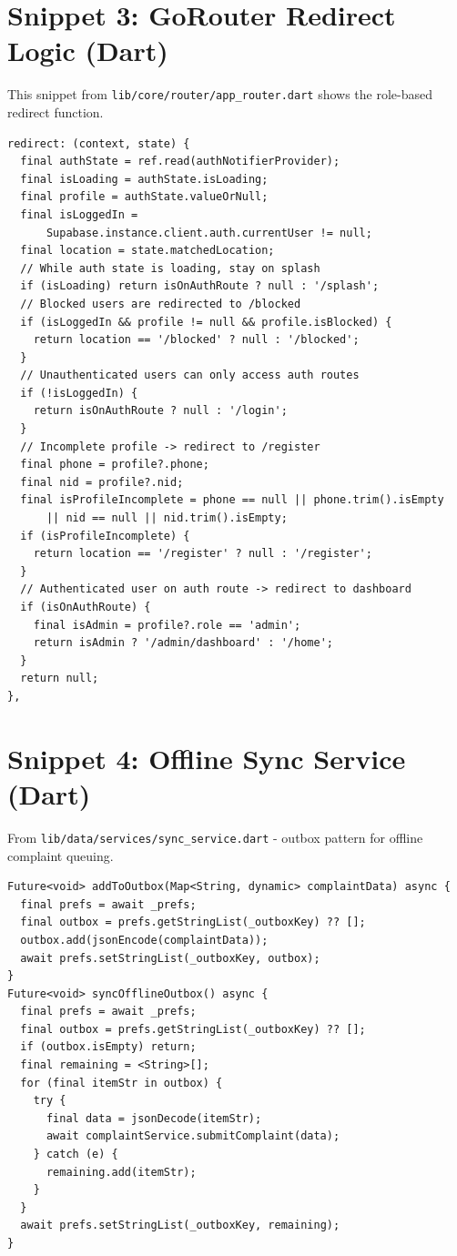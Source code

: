 \documentclass[12pt, a4paper, twoside]{report}
\begin{document}
\section*{Snippet 3: GoRouter Redirect Logic (Dart)}
This snippet from \texttt{lib/core/router/app\_router.dart} shows the role-based redirect function.
\begin{footnotesize}
\begin{verbatim}
redirect: (context, state) {
  final authState = ref.read(authNotifierProvider);
  final isLoading = authState.isLoading;
  final profile = authState.valueOrNull;
  final isLoggedIn = 
      Supabase.instance.client.auth.currentUser != null;
  final location = state.matchedLocation;
  // While auth state is loading, stay on splash
  if (isLoading) return isOnAuthRoute ? null : '/splash';
  // Blocked users are redirected to /blocked
  if (isLoggedIn && profile != null && profile.isBlocked) {
    return location == '/blocked' ? null : '/blocked';
  }
  // Unauthenticated users can only access auth routes
  if (!isLoggedIn) {
    return isOnAuthRoute ? null : '/login';
  }
  // Incomplete profile -> redirect to /register
  final phone = profile?.phone;
  final nid = profile?.nid;
  final isProfileIncomplete = phone == null || phone.trim().isEmpty 
      || nid == null || nid.trim().isEmpty;
  if (isProfileIncomplete) {
    return location == '/register' ? null : '/register';
  }
  // Authenticated user on auth route -> redirect to dashboard
  if (isOnAuthRoute) {
    final isAdmin = profile?.role == 'admin';
    return isAdmin ? '/admin/dashboard' : '/home';
  }
  return null;
},
\end{verbatim}
\end{footnotesize}
\vspace{1cm}
\section*{Snippet 4: Offline Sync Service (Dart)}
From \texttt{lib/data/services/sync\_service.dart} - outbox pattern for offline complaint queuing.
\begin{footnotesize}
\begin{verbatim}
Future<void> addToOutbox(Map<String, dynamic> complaintData) async {
  final prefs = await _prefs;
  final outbox = prefs.getStringList(_outboxKey) ?? [];
  outbox.add(jsonEncode(complaintData));
  await prefs.setStringList(_outboxKey, outbox);
}
Future<void> syncOfflineOutbox() async {
  final prefs = await _prefs;
  final outbox = prefs.getStringList(_outboxKey) ?? [];
  if (outbox.isEmpty) return;
  final remaining = <String>[];
  for (final itemStr in outbox) {
    try {
      final data = jsonDecode(itemStr);
      await complaintService.submitComplaint(data);
    } catch (e) {
      remaining.add(itemStr);
    }
  }
  await prefs.setStringList(_outboxKey, remaining);
}
\end{verbatim}
\end{footnotesize}
\vspace{1cm}
\end{document}
